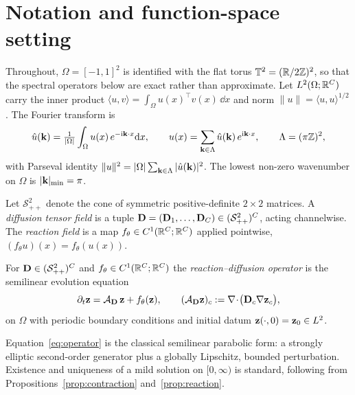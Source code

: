 \section{Notation and function-space setting}
\label{app:notation}

Throughout, $\Omega = [-1,1]^2$ is identified with the flat torus
$\mathbb{T}^2 = (\mathbb{R}/2\mathbb{Z})^2$, so that the spectral operators below are exact
rather than approximate. Let $L^2(\Omega;\mathbb{R}^C)$ carry the inner product
$\langle u,v\rangle = \int_\Omega u(x)^\top v(x)\,\dd x$ and norm
$\|u\| = \langle u,u\rangle^{1/2}$. The Fourier transform is
\begin{equation}
\hat{u}(\mathbf{k}) = \tfrac{1}{|\Omega|}\int_\Omega u(x)\,e^{-\mathrm{i}\mathbf{k}\cdot x}\mathrm{d} x,
\qquad
u(x) = \sum_{\mathbf{k}\in\Lambda} \hat{u}(\mathbf{k})\,e^{\mathrm{i}\mathbf{k}\cdot x},
\qquad
\Lambda = (\pi\mathbb{Z})^2 ,
\label{eq:fourier}
\end{equation}
with Parseval identity $\|u\|^2 = |\Omega|\sum_{\mathbf{k}\in\Lambda}|\hat u(\mathbf{k})|^2$.
The lowest non-zero wavenumber on $\Omega$ is $|\mathbf{k}|_{\min} = \pi$.

Let $\mathcal{S}_{++}^2$ denote the cone of symmetric positive-definite
$2\times2$ matrices. A \emph{diffusion tensor field} is a tuple
$\mathbf{D} = (\mathbf{D}_1,\dots,\mathbf{D}_C) \in (\mathcal{S}_{++}^2)^C$, acting channelwise. The
\emph{reaction field} is a map $f_\theta \in C^1(\mathbb{R}^C;\mathbb{R}^C)$ applied pointwise,
$(f_\theta u)(x) = f_\theta(u(x))$.

\begin{definition}
\label{def:operator}
For $\mathbf{D} \in (\mathcal{S}_{++}^2)^C$ and $f_\theta \in C^1(\mathbb{R}^C;\mathbb{R}^C)$ the
\emph{reaction--diffusion operator} is the semilinear evolution equation
\begin{equation}
\partial_t \mathbf{z} = \mathcal{A}_{\mathbf{D}}\,\mathbf{z} + f_\theta(\mathbf{z}),
\qquad
(\mathcal{A}_{\mathbf{D}}\mathbf{z})_c := \nabla\!\cdot\!\big(\mathbf{D}_c \nabla \mathbf{z}_c\big),
\label{eq:operator}
\end{equation}
on $\Omega$ with periodic boundary conditions and initial datum
$\mathbf{z}(\cdot,0)=\mathbf{z}_0 \in L^2$.
\end{definition}

Equation~\eqref{eq:operator} is the classical semilinear parabolic form: a
strongly elliptic second-order generator plus a globally Lipschitz, bounded
perturbation. Existence and uniqueness of a mild solution on $[0,\infty)$ is
standard, following from Propositions~\ref{prop:contraction} and~\ref{prop:reaction}.

